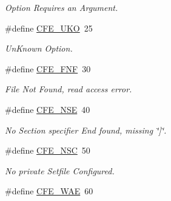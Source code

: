 \begin{DoxyCompactItemize}
\begin{DoxyCompactList}\small\item\em Option Requires an Argument. \end{DoxyCompactList}\item 
\hypertarget{group__errors_ga77e1698381143e412a7a4796b2b8f564}{\#define \hyperlink{group__errors_ga77e1698381143e412a7a4796b2b8f564}{C\-F\-E\-\_\-\-U\-K\-O}~25}\label{group__errors_ga77e1698381143e412a7a4796b2b8f564}

\begin{DoxyCompactList}\small\item\em Un\-Known Option. \end{DoxyCompactList}\item 
\hypertarget{group__errors_gaa3d4c51112fd70d482a4a77c95dc3daf}{\#define \hyperlink{group__errors_gaa3d4c51112fd70d482a4a77c95dc3daf}{C\-F\-E\-\_\-\-F\-N\-F}~30}\label{group__errors_gaa3d4c51112fd70d482a4a77c95dc3daf}

\begin{DoxyCompactList}\small\item\em File Not Found, read access error. \end{DoxyCompactList}\item 
\hypertarget{group__errors_gae1f1ad273da29546c89e9e6761b8b3e2}{\#define \hyperlink{group__errors_gae1f1ad273da29546c89e9e6761b8b3e2}{C\-F\-E\-\_\-\-N\-S\-E}~40}\label{group__errors_gae1f1ad273da29546c89e9e6761b8b3e2}

\begin{DoxyCompactList}\small\item\em No Section specifier End found, missing \char`\"{}\mbox{]}\char`\"{}. \end{DoxyCompactList}\item 
\hypertarget{group__errors_gae67acd8919ba3a30ca6a6f2857dc3628}{\#define \hyperlink{group__errors_gae67acd8919ba3a30ca6a6f2857dc3628}{C\-F\-E\-\_\-\-N\-S\-C}~50}\label{group__errors_gae67acd8919ba3a30ca6a6f2857dc3628}

\begin{DoxyCompactList}\small\item\em No private Setfile Configured. \end{DoxyCompactList}\item 
\hypertarget{group__errors_gad1375fe531ed1c13233e2fa7ae55534f}{\#define \hyperlink{group__errors_gad1375fe531ed1c13233e2fa7ae55534f}{C\-F\-E\-\_\-\-W\-A\-E}~60}\label{group__errors_gad1375fe531ed1c13233e2fa7ae55534f}


\end{DoxyCompactItemize}
